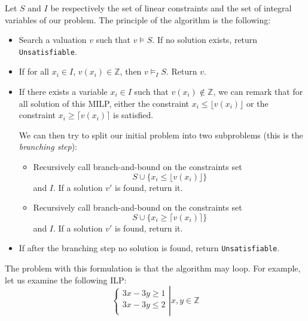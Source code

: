\documentclass{article}
\newcommand{\cunsat}{\texttt{Unsatisfiable}}
\newcommand{\ints}{\mathbb{Z}}
\begin{document}
Let $S$ and $I$ be respectively the set of linear constraints and the set of
integral variables of our problem. The principle of the algorithm is the
following:
\begin{itemize}
  \item Search a valuation $v$ such that $v \vDash S$. If no solution exists,
    return \cunsat{}.
  \item If for all $x_i \in I$, $v(x_i) \in \ints$, then $v \vDash_I S$.
    Return $v$.
  \item If there exists a variable $x_i \in I$ such that
    $v(x_i) \notin \ints$, we can remark that for all solution of this
    MILP, either the constraint $x_i \leqslant \lfloor v(x_i) \rfloor$ 
    or the constraint $x_i \geqslant \lceil v(x_i) \rceil$ is satisfied.
    
    We can then try to split our initial problem into two subproblems (this is
    the \textit{branching step}):
    \begin{itemize}
      \item Recursively call branch-and-bound on the constraints set
        $$S \cup \{x_i \leqslant \lfloor v(x_i) \rfloor\}$$ and $I$.
        If a solution $v'$ is found, return it.
      \item Recursively call branch-and-bound on the constraints set
        $$S \cup \{x_i \geqslant \lceil v(x_i) \rceil\}$$ and $I$.
        If a solution $v'$ is found, return it.
    \end{itemize}
  \item If after the branching step no solution is found, return \cunsat{}.
\end{itemize}

%

The problem with this formulation is that the algorithm may loop. For example,
let us examine the following ILP:
\begin{equation} \label{pbloop}
  \left\{
  \begin{array}{l}
    3x - 3y \geqslant 1 \\
    3x - 3y \leqslant 2 \\
  \end{array}
  \right|
  x, y \in \ints
\end{equation}
\end{document}
